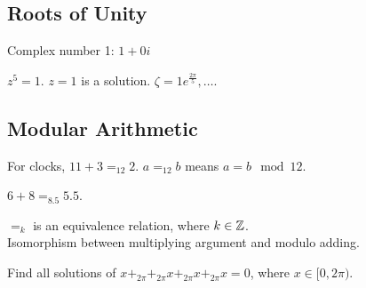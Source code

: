 \documentclass[class=article,crop=false]{standalone}
\begin{document}
\subsection{Roots of Unity}
Complex number 1: $1+0i$\\
 \begin{eg}[]
$z^{5}=1$. $z=1$ is a solution. 
 $\zeta=1e^{\frac{2\pi}{5}},\ldots$.
\end{eg}

\subsection{Modular Arithmetic}

\begin{eg}[]
	For clocks, $11+3 =_{12} 2 $. $a=_{12} b$ means  $a=b \mod 12$.
\end{eg}

\begin{eg}[]
	$6+ 8 =_{8.5} 5.5$.
\end{eg}
$=_k$ is an equivalence relation, where $k \in \mathbb{Z}$.\\

Isomorphism between multiplying argument and modulo adding.

\begin{eg}[]
	Find all solutions of $ x+_{2\pi} +_{2\pi} x +_{2\pi} x +_{2\pi} x = 0$, where $ x \in [0,2\pi).$ \\
	
\end{eg}
\end{document}
